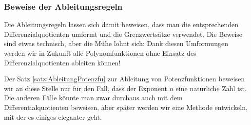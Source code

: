 \subsubsection{Beweise der Ableitungsregeln}

Die Ableitungsregeln lassen sich damit beweisen, dass man die entsprechenden Differenzialquotienten umformt und die Grenzwertsätze verwendet. Die Beweise sind etwas technisch, aber die Mühe lohnt sich: Dank diesen Umformungen werden wir in Zukunft alle Polynomfunktionen ohne Einsatz des Differenzialquotienten ableiten können!

Der Satz \ref*{satz:AbleitungPotenzfu} zur Ableitung von Potenzfunktionen beweisen wir an diese Stelle nur für den Fall, dass der Exponent $n$ eine natürliche Zahl ist. Die anderen Fälle könnte man zwar durchaus auch mit dem Differentialquotienten beweisen, aber später werden wir eine Methode entwickeln, mit der es einiges eleganter geht.

